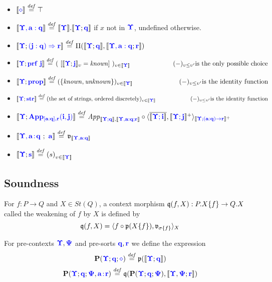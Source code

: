 \documentclass{article}
\newcommand{\blu}[1]{\mathbf{\color{blue}{#1}}}
\newcommand{\mbf}{\mathbf}
\newcommand{\sem}[1]{\llbracket #1 \rrbracket}
\newcommand{\defeq}{\overset{\mathit{def}}{=}}
\newcommand{\fm}[2]{
\left(
\tiny
#1
\normalsize
\right)_{#2}
}
\begin{document}
\begin{itemize}
\item $\sem{\blu{\diamond}} \defeq \top$
\item $\sem{\blu{\Upsilon,a:q}} \defeq \sem{\blu{\Upsilon}}.\sem{\blu{\Upsilon};\blu{q}}$ if $x$ not in $\blu{\Upsilon}$, undefined otherwise.
\item $\sem{\blu{\Upsilon}; \blu{(j : q) \Rightarrow r}} \defeq \Pi(\sem{\blu{\Upsilon};\blu{q}},\sem{\blu{\Upsilon,a:q};\blu{r}})$
\item $\sem{\blu{\Upsilon}; \blu{\mathbf{prf}~j}} \defeq (~[ \sem{\blu{\Upsilon}; \blu{j}}_\upsilon = \mathit{known} ]~)_{\upsilon \in \sem{\blu{\Upsilon}}}\\ ~~~~~~~~~~~~~~~~~~~~(-)_{\upsilon \leq \upsilon'} \text{is the only possible choice}$
\item $\sem{\blu{\Upsilon}; \blu{prop}} \defeq ( \{ \mathit{known}, \mathit{unknown} \} )_{\upsilon \in \sem{\blu{\Upsilon}}}  \\ ~~~~~~~~~~~~~~~~~~~~~(-)_{\upsilon \leq \upsilon'} \text{is the identity function}$
\item $\sem{\blu{\Upsilon}; \blu{str}} \defeq (\text{the set of strings, ordered discretely})_{\upsilon \in \sem{\blu{\Upsilon}}} \\ ~~~~~~~~~~~~~~~~~~(-)_{\upsilon \leq \upsilon'} \text{is the identity function}$
\item $\sem{\blu{\Upsilon}; \blu{App_{[a:q],r}(i,j)}} \defeq \mathit{App}_{\sem{\blu{\Upsilon;q}},\sem{\blu{\Upsilon,a:q;r}}} \circ \langle \overline{\sem{\blu{\Upsilon ; i}}}, \sem{\blu{\Upsilon ; j}}^+ \rangle_{\sem{\blu{\Upsilon ; \blu{(a : q) \to r}}}^+}$
\item $\sem{\blu{\Upsilon,a \! : \! q}~;~\blu{a}} \defeq \frak{v}_{\sem{\blu{\Upsilon,a:q}}}$
\item $\sem{\blu{\Upsilon};\blu{s}} \defeq \fm{s}{\upsilon \in \sem{\blu{\Upsilon}}}$
\end{itemize}

\subsection*{Soundness}

For $f : P \to Q$ and $X \in \mathit{St}(Q)$, a context morphism $\frak q(f,X) : P.X \{ f \} \to Q . X$ called the weakening of $f$ by $X$ is defined by 
$$\frak{q}(f,X) = \langle f \circ \frak{p}(X \{ f \}), \frak {v}_{\sigma \{ f \}} \rangle_{X}$$

For pre-contexts $\blu{\Upsilon},\blu{\Psi}$ and pre-sorts $\blu{q},\blu{r}$ we define the expression 
$$\mbf{P}(\blu{\Upsilon} ; \blu{q} ; \blu{\diamond}) \defeq \frak {p}(\sem{\blu{\Upsilon};\blu{q}})$$
$$\mbf{P}(\blu{\Upsilon};\blu{q};\blu{\Psi},\blu{a \! : \! r}) \defeq \frak q (\mbf{P}(\blu{\Upsilon};\blu{q};\blu{\Psi}),\sem{\blu{\Upsilon},\blu{\Psi};\blu{r}})$$
\end{document}

